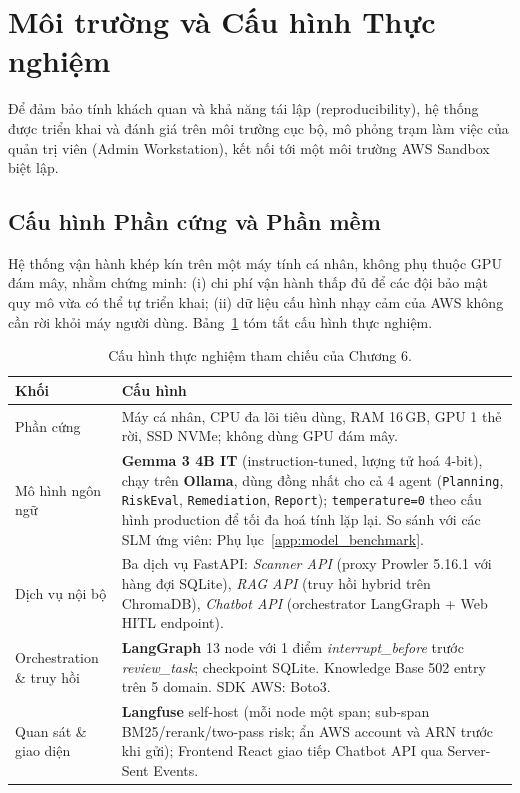 \section{Môi trường và Cấu hình Thực nghiệm}
\label{sec:eval_environment}

Để đảm bảo tính khách quan và khả năng tái lập (reproducibility), hệ thống được triển khai và đánh giá trên môi trường cục bộ, mô phỏng trạm làm việc của quản trị viên (Admin Workstation), kết nối tới một môi trường AWS Sandbox biệt lập.

\subsection{Cấu hình Phần cứng và Phần mềm}
Hệ thống vận hành khép kín trên một máy tính cá nhân, không phụ thuộc GPU đám mây, nhằm chứng minh: (i) chi phí vận hành thấp đủ để các đội bảo mật quy mô vừa có thể tự triển khai; (ii) dữ liệu cấu hình nhạy cảm của AWS không cần rời khỏi máy người dùng. Bảng~\ref{tab:eval_env_config} tóm tắt cấu hình thực nghiệm.

\begin{table}[!htb]
  \centering
  \caption{Cấu hình thực nghiệm tham chiếu của Chương 6.}
  \label{tab:eval_env_config}
  \small
  \begin{tabular}{p{4cm}p{10cm}}
    \toprule
    \textbf{Khối} & \textbf{Cấu hình} \\
    \midrule
    Phần cứng & Máy cá nhân, CPU đa lõi tiêu dùng, RAM 16\,GB, GPU 1 thẻ rời, SSD NVMe; không dùng GPU đám mây. \\
    \addlinespace
    Mô hình ngôn ngữ & \textbf{Gemma 3 4B IT} (instruction-tuned, lượng tử hoá 4-bit), chạy trên \textbf{Ollama}, dùng đồng nhất cho cả 4 agent (\texttt{Planning}, \texttt{RiskEval}, \texttt{Remediation}, \texttt{Report}); \texttt{temperature=0} theo cấu hình production để tối đa hoá tính lặp lại. So sánh với các SLM ứng viên: Phụ lục~\ref{app:model_benchmark}. \\
    \addlinespace
    Dịch vụ nội bộ & Ba dịch vụ FastAPI: \textit{Scanner API} (proxy Prowler 5.16.1 với hàng đợi SQLite), \textit{RAG API} (truy hồi hybrid trên ChromaDB), \textit{Chatbot API} (orchestrator LangGraph + Web HITL endpoint). \\
    \addlinespace
    Orchestration \& truy hồi & \textbf{LangGraph} 13 node với 1 điểm \emph{interrupt\_before} trước \textit{review\_task}; checkpoint SQLite. Knowledge Base 502 entry trên 5 domain. SDK AWS: Boto3. \\
    \addlinespace
    Quan sát \& giao diện & \textbf{Langfuse} self-host (mỗi node một span; sub-span BM25/rerank/two-pass risk; ẩn AWS account và ARN trước khi gửi); Frontend React giao tiếp Chatbot API qua Server-Sent Events. \\
    \bottomrule
  \end{tabular}
\end{table}

